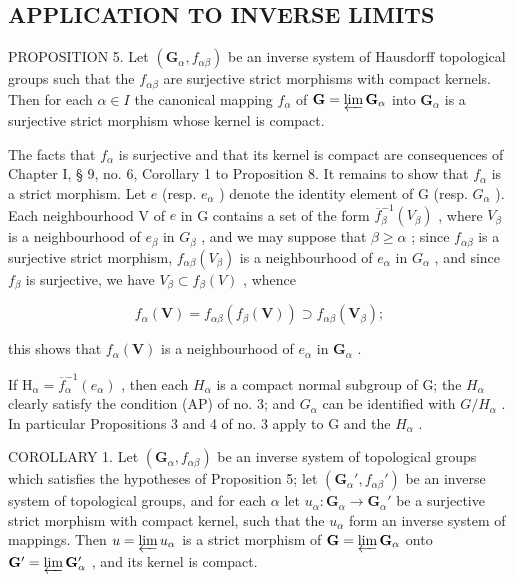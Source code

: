 \subsection{APPLICATION TO INVERSE LIMITS}

PROPOSITION 5. Let \((\mathbf{G}_{\alpha}, f_{\alpha \beta})\) be an inverse system of Hausdorff topological groups such that the \(f_{\alpha \beta}\) are surjective strict morphisms with compact kernels. Then for each \(\alpha \in I\) the canonical mapping \(f_{\alpha}\) of \(\mathbf{G} = \varprojlim \mathbf{G}_{\alpha}\) into \(\mathbf{G}_{\alpha}\) is a surjective strict morphism whose kernel is compact.

The facts that \(f_{\alpha}\) is surjective and that its kernel is compact are consequences of Chapter I, § 9, no. 6, Corollary 1 to Proposition 8. It remains to show that \(f_{\alpha}\) is a strict morphism. Let \(e\) (resp. \(e_{\alpha}\) ) denote the identity element of G (resp. \(G_{\alpha}\) ). Each neighbourhood V of \(e\) in G contains a set of the form \(\overline{f}_{\beta}^{-1}(V_{\beta})\) , where \(V_{\beta}\) is a neighbourhood of \(e_{\beta}\) in \(G_{\beta}\) , and we may suppose that \(\beta \geqslant \alpha\) ; since \(f_{\alpha \beta}\) is a surjective strict morphism, \(f_{\alpha \beta}(V_{\beta})\) is a neighbourhood of \(e_{\alpha}\) in \(G_{\alpha}\) , and since \(f_{\beta}\) is surjective, we have \(V_{\beta} \subset f_{\beta}(V)\) , whence

\[
f _ {\alpha} (\mathbf {V}) = f _ {\alpha \beta} (f _ {\beta} (\mathbf {V})) \supset f _ {\alpha \beta} (\mathbf {V} _ {\beta});
\]

this shows that \(f_{\alpha}(\mathbf{V})\) is a neighbourhood of \(e_{\alpha}\) in \(\mathbf{G}_{\alpha}\) .

If \(\mathrm{H}_{\alpha}=\overline{f}_{\alpha}^{-1}(e_{\alpha})\) , then each \(H_{\alpha}\) is a compact normal subgroup of G; the \(H_{\alpha}\) clearly satisfy the condition (AP) of no. 3; and \(G_{\alpha}\) can be identified with \(G/H_{\alpha}\) . In particular Propositions 3 and 4 of no. 3 apply to G and the \(H_{\alpha}\) .

COROLLARY 1. Let \((\mathbf{G}_{\alpha}, f_{\alpha \beta})\) be an inverse system of topological groups which satisfies the hypotheses of Proposition 5; let \((\mathbf{G}_{\alpha}', f_{\alpha \beta}')\) be an inverse system of topological groups, and for each \(\alpha\) let \(u_{\alpha}: \mathbf{G}_{\alpha} \to \mathbf{G}_{\alpha}'\) be a surjective strict morphism with compact kernel, such that the \(u_{\alpha}\) form an inverse system of mappings. Then \(u = \varprojlim u_{\alpha}\) is a strict morphism of \(\mathbf{G} = \varprojlim \mathbf{G}_{\alpha}\) onto \(\mathbf{G}' = \varprojlim \mathbf{G}_{\alpha}'\) , and its kernel is compact.

